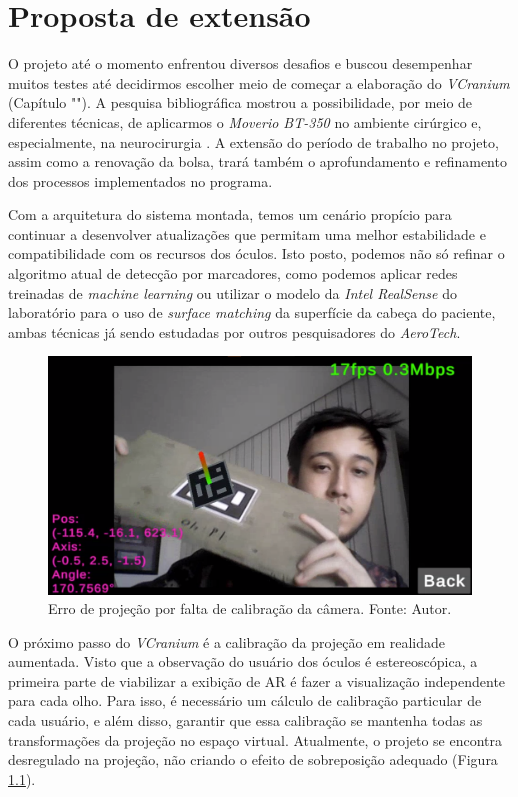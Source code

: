 \chapter{Proposta de extensão}\label{chp:extensao}

O projeto até o momento enfrentou diversos desafios e buscou desempenhar muitos testes até decidirmos escolher meio de começar a elaboração do \textit{VCranium} (Capítulo ""). A pesquisa bibliográfica mostrou a possibilidade, por meio de diferentes técnicas, de aplicarmos o \textit{Moverio BT-350} no ambiente cirúrgico e, especialmente, na neurocirurgia \cite{Cho2020}. A extensão do período de trabalho no projeto, assim como a renovação da bolsa, trará também o aprofundamento e refinamento dos processos implementados no programa.

Com a arquitetura do sistema montada, temos um cenário propício para continuar a desenvolver atualizações que permitam uma melhor estabilidade e compatibilidade com os recursos dos óculos. Isto posto, podemos não só refinar o algoritmo atual de detecção por marcadores, como podemos aplicar redes treinadas de \textit{machine learning} ou utilizar o modelo da \textit{Intel RealSense} do laboratório para o uso de \textit{surface matching} da superfície da cabeça do paciente, ambas técnicas já sendo estudadas por outros pesquisadores do \textit{AeroTech}.

\begin{figure}[ht]
    \centering
    \includegraphics[width=.6\linewidth]{figuras/vcranium_calibration.png}
    \caption{Erro de projeção por falta de calibração da câmera. Fonte: Autor.}
    \label{fig:vcranium-calibration}
\end{figure}

O próximo passo do \textit{VCranium} é a calibração da projeção em realidade aumentada. Visto que a observação do usuário dos óculos é estereoscópica, a primeira parte de viabilizar a exibição de AR é fazer a visualização independente para cada olho. Para isso, é necessário um cálculo de calibração particular de cada usuário, e além disso, garantir que essa calibração se mantenha todas as transformações da projeção no espaço virtual. Atualmente, o projeto se encontra desregulado na projeção, não criando o efeito de sobreposição adequado (Figura \ref{fig:vcranium-calibration}).

